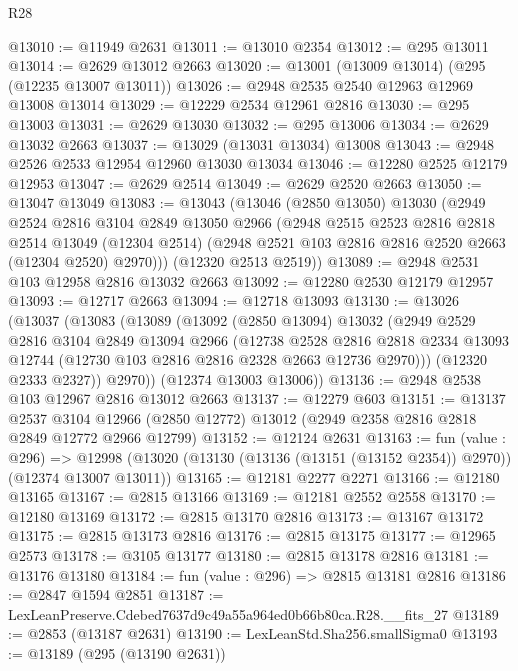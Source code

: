 \begin{lexlean}{R28}
\begin{coremodule}
@13010 := @11949 @2631
@13011 := @13010 @2354
@13012 := @295 @13011
@13014 := @2629 @13012 @2663
@13020 := @13001 (@13009 @13014) (@295 (@12235 @13007 @13011))
@13026 := @2948 @2535 @2540 @12963 @12969 @13008 @13014
@13029 := @12229 @2534 @12961 @2816
@13030 := @295 @13003
@13031 := @2629 @13030
@13032 := @295 @13006
@13034 := @2629 @13032 @2663
@13037 := @13029 (@13031 @13034) @13008
@13043 := @2948 @2526 @2533 @12954 @12960 @13030 @13034
@13046 := @12280 @2525 @12179 @12953
@13047 := @2629 @2514
@13049 := @2629 @2520 @2663
@13050 := @13047 @13049
@13083 := @13043
    (@13046
      (@2850 @13050)
      @13030
      (@2949
        @2524
        @2816
        @3104
        @2849
        @13050
        @2966
        (@2948
          @2515
          @2523
          @2816
          @2818
          @2514
          @13049
          (@12304 @2514)
          (@2948 @2521 @103 @2816 @2816 @2520 @2663 (@12304 @2520) @2970)))
      (@12320 @2513 @2519))
@13089 := @2948 @2531 @103 @12958 @2816 @13032 @2663
@13092 := @12280 @2530 @12179 @12957
@13093 := @12717 @2663
@13094 := @12718 @13093
@13130 := @13026
    (@13037
      (@13083
        (@13089
          (@13092
            (@2850 @13094)
            @13032
            (@2949
              @2529
              @2816
              @3104
              @2849
              @13094
              @2966
              (@12738
                @2528
                @2816
                @2818
                @2334
                @13093
                @12744
                (@12730 @103 @2816 @2816 @2328 @2663 @12736 @2970)))
            (@12320 @2333 @2327))
          @2970))
      (@12374 @13003 @13006))
@13136 := @2948 @2538 @103 @12967 @2816 @13012 @2663
@13137 := @12279 @603
@13151 := @13137
    @2537
    @3104
    @12966
    (@2850 @12772)
    @13012
    (@2949 @2358 @2816 @2818 @2849 @12772 @2966 @12799)
@13152 := @12124 @2631
@13163 := fun (value : @296) =>
  @12998 (@13020 (@13130 (@13136 (@13151 (@13152 @2354)) @2970)) (@12374 @13007 @13011))
@13165 := @12181 @2277 @2271
@13166 := @12180 @13165
@13167 := @2815 @13166
@13169 := @12181 @2552 @2558
@13170 := @12180 @13169
@13172 := @2815 @13170 @2816
@13173 := @13167 @13172
@13175 := @2815 @13173 @2816
@13176 := @2815 @13175
@13177 := @12965 @2573
@13178 := @3105 @13177
@13180 := @2815 @13178 @2816
@13181 := @13176 @13180
@13184 := fun (value : @296) => @2815 @13181 @2816
@13186 := @2847 @1594 @2851
@13187 := LexLeanPreserve.Cdebed7637d9c49a55a964ed0b66b80ca.R28.__fits_27
@13189 := @2853 (@13187 @2631)
@13190 := LexLeanStd.Sha256.smallSigma0
@13193 := @13189 (@295 (@13190 @2631))

\end{coremodule}
\end{lexlean}
